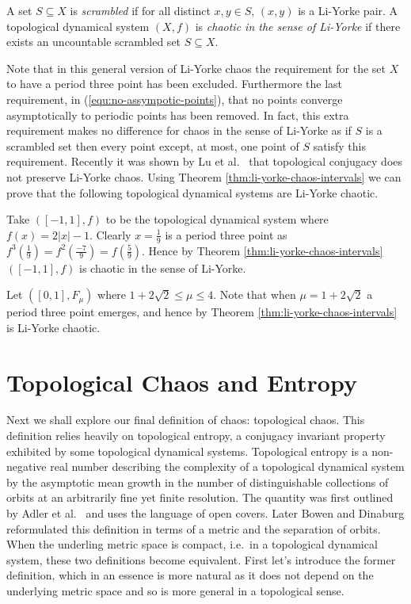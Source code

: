 \begin{defn}  \label{defn:scrambled-set}
    A set $S \subseteq X$ is \emph{scrambled} if for all distinct $x, y \in S$, $(x, y)$ is a Li-Yorke pair. A topological dynamical system $(X, f)$ is \emph{chaotic in the sense of Li-Yorke} if there exists an uncountable scrambled set $S \subseteq X$.
\end{defn}

Note that in this general version of Li-Yorke chaos the requirement for the set $X$ to have a period three point has been excluded. Furthermore the last requirement, in (\ref{equ:no-assympotic-points}), that no points converge asymptotically to periodic points has been removed. In fact, this extra requirement makes no difference for chaos in the sense of Li-Yorke as if $S$ is a scrambled set then every point except, at most, one point of $S$ satisfy this requirement. Recently it was shown by Lu et al.\ \cite{lu-zhu-wu} that topological conjugacy does not preserve Li-Yorke chaos. Using Theorem \ref{thm:li-yorke-chaos-intervals} we can prove that the following topological dynamical systems are Li-Yorke chaotic.

\begin{exmp}
    Take $([-1, 1], f)$ to be the topological dynamical system where $f(x) = 2 |x| - 1$. Clearly $x = \frac{1}{9}$ is a period three point as $f^3\left(\frac{1}{9}\right) = f^2\left(\frac{-7}{9}\right) = f\left(\frac{5}{9}\right)$. Hence by Theorem \ref{thm:li-yorke-chaos-intervals} $([-1, 1], f)$ is chaotic in the sense of Li-Yorke.
\end{exmp}

\begin{exmp}
    Let $([0, 1], F_\mu)$ where $1 + 2\sqrt{2} \leq \mu \leq 4$. Note that when $\mu = 1 + 2\sqrt{2}$ a period three point emerges, and hence by Theorem \ref{thm:li-yorke-chaos-intervals} is Li-Yorke chaotic.
\end{exmp}

\section{Topological Chaos and Entropy} \label{sec:topological-chaos}
Next we shall explore our final definition of chaos: topological chaos. This definition relies heavily on topological entropy, a conjugacy invariant property exhibited by some topological dynamical systems. Topological entropy is a non-negative real number describing the complexity of a topological dynamical system by the asymptotic mean growth in the number of distinguishable collections of orbits at an arbitrarily fine yet finite resolution. The quantity was first outlined by Adler et al.\ \cite{adler} and uses the language of open covers. Later Bowen \cite{bowen} and Dinaburg \cite{dinaburg} reformulated this definition in terms of a metric and the separation of orbits. When the underling metric space is compact, i.e.\ in a topological dynamical system, these two definitions become equivalent. First let's introduce the former definition, which in an essence is more natural as it does not depend on the underlying metric space and so is more general in a topological sense.

